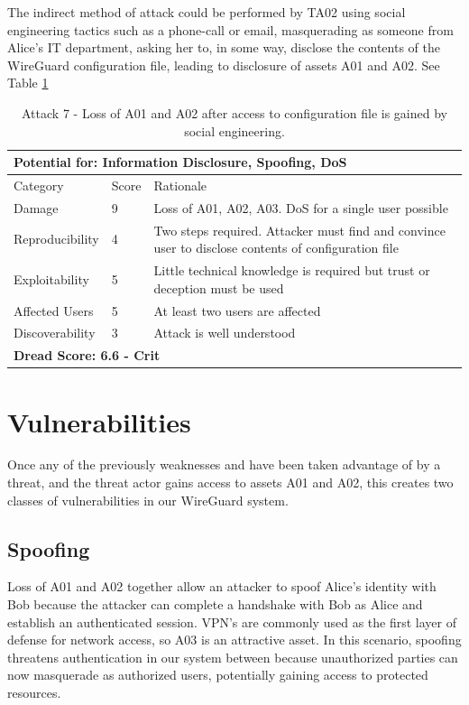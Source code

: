 \documentclass [11pt, proquest] {uwthesis}[2020/02/24]
\begin{document}
The indirect method of attack could be performed by TA02 using social engineering tactics such as a phone-call or email, masquerading as someone from Alice's IT department, asking her to, in some way, disclose the contents of the WireGuard configuration file, leading to disclosure of assets A01 and A02.
See Table \ref{ref:attack7} 

\begin{table}[H]
\begin{tabular}{|m{3cm}|m{1cm}|p{27em} |}
\multicolumn{3}{l}{Potential for: Information Disclosure, Spoofing, DoS}                   \\
\hline
Category & Score & Rationale \\
\hline
Damage          & 9     & Loss of A01, A02, A03. DoS for a single user possible            \\
\hline
Reproducibility & 4     & Two steps required. Attacker must find and convince user to disclose contents of configuration file    \\
\hline
Exploitability & 5      & Little technical knowledge is required but trust or deception must be used   \\
\hline
Affected Users  & 5     & At least two users are affected                      \\
\hline
Discoverability & 3     & Attack is well understood  \\
\hline
\multicolumn{3}{l}{\textbf{Dread Score: 6.6 - Crit}} 
\end{tabular}
\caption{Attack 7 - Loss of A01 and A02 after access to configuration file is gained by social engineering.}
\label{ref:attack7}
\end{table}

\section{Vulnerabilities}
\label{vulns}
Once any of the previously weaknesses and have been taken advantage of by a threat, and the threat actor gains access to assets A01 and A02, this creates two classes of vulnerabilities in our WireGuard system.

\subsection{Spoofing}
\label{spoofing}
Loss of A01 and A02 together allow an attacker to spoof Alice's identity with Bob because the attacker can complete a handshake with Bob as Alice and establish an authenticated session. VPN's are commonly used as the first layer of defense for network access, so A03 is an attractive asset.
In this scenario, spoofing threatens authentication in our system between because unauthorized parties can now masquerade as authorized users, potentially gaining access to protected resources. 
\end{document}

